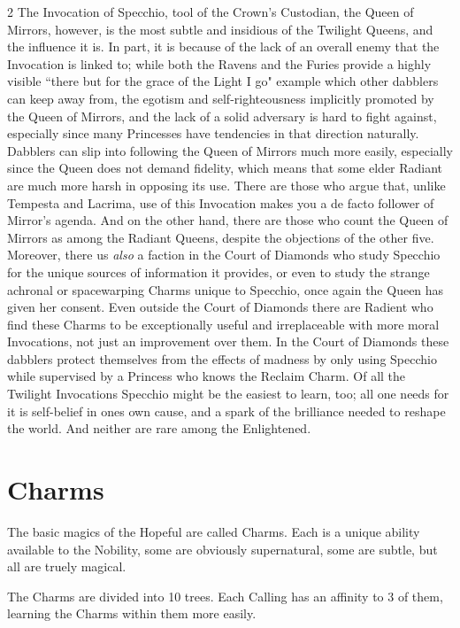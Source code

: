 \begin{multicols}{2}
The Invocation of Specchio, tool of the Crown's Custodian, the Queen of Mirrors, however, is the most subtle and insidious of the Twilight Queens, and the influence it is. In part, it is because of the lack of an overall enemy that the Invocation is linked to; while both the Ravens and the Furies provide a highly visible \textquotedblleft there but for the grace of the Light I go" example which other dabblers can keep away from, the egotism and self-righteousness implicitly promoted by the Queen of Mirrors, and the lack of a solid adversary is hard to fight against, especially since many Princesses have tendencies in that direction naturally. Dabblers can slip into following the Queen of Mirrors much more easily, especially since the Queen does not demand fidelity, which means that some elder Radiant are much more harsh in opposing its use. There are those who argue that, unlike Tempesta and Lacrima, use of this Invocation makes you a de facto follower of Mirror's agenda. And on the other hand, there are 
those who count the Queen of Mirrors as among the Radiant Queens, despite the objections of the other five. Moreover, there us \textit{also} a faction in the Court of Diamonds who study Specchio for the unique sources of information it provides, or even to study the strange achronal or spacewarping Charms unique to Specchio, once again the Queen has given her consent. Even outside the Court of Diamonds there are Radient who find these Charms to be exceptionally useful and irreplaceable with more moral Invocations, not just an improvement over them. In the Court of Diamonds these dabblers protect themselves from the effects of madness by only using Specchio while supervised by a Princess who knows the Reclaim Charm. Of all the Twilight Invocations Specchio might be the easiest to learn, too; all one needs for it is self-belief in ones own cause, and a spark of the brilliance needed to reshape the world. And neither are rare among the Enlightened. 

\bigsidebarend



\section*{Charms}
\label{sec:Charms}
The basic magics of the Hopeful are called Charms. Each is a unique ability available to the Nobility, some are obviously supernatural, some are subtle, but all are truely magical. 

The Charms are divided into 10 trees. Each Calling has an affinity to 3 of them, learning the Charms within them more easily. 


\end{multicols}
